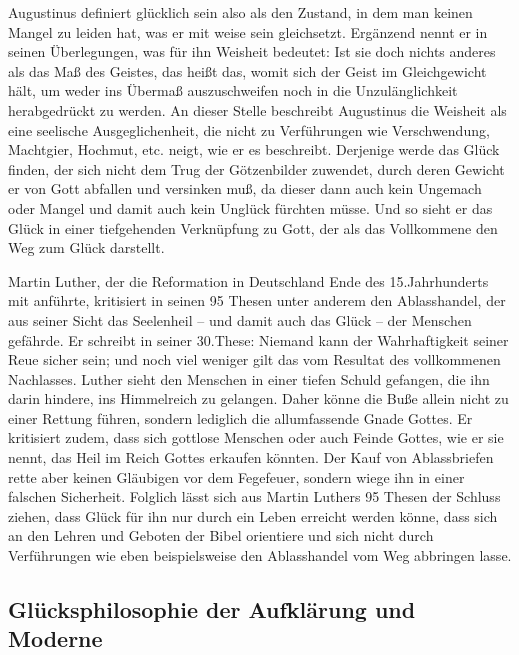 Augustinus definiert \glqq glücklich sein\grqq{} also als den Zustand, in dem man keinen Mangel zu leiden hat, was er mit \glqq weise sein\grqq{} gleichsetzt. 
Ergänzend nennt er in seinen Überlegungen, was für ihn Weisheit bedeutet: \glqq Ist sie doch nichts anderes als das Maß des Geistes, das heißt das, womit sich der Geist im Gleichgewicht hält, um weder ins Übermaß auszuschweifen noch in die Unzulänglichkeit herabgedrückt zu werden.\grqq{} \cite[S.\,59]{A82} 
An dieser Stelle beschreibt Augustinus die Weisheit als eine seelische Ausgeglichenheit, die nicht zu Verführungen wie Verschwendung, Machtgier, Hochmut, etc. neigt, wie er es beschreibt. 
Derjenige werde das Glück finden, der sich nicht \glqq dem Trug der Götzenbilder zuwendet, durch deren Gewicht er von Gott abfallen und versinken muß\grqq{}, da dieser dann auch kein Ungemach oder Mangel und damit auch kein Unglück fürchten müsse. 
Und so sieht er das Glück in einer tiefgehenden Verknüpfung zu Gott, der als das Vollkommene den Weg zum Glück darstellt.

Martin Luther, der die Reformation in Deutschland Ende des 15.Jahrhunderts mit anführte, kritisiert in seinen 95 Thesen unter anderem den Ablasshandel, der aus seiner Sicht das Seelenheil -- und damit auch das Glück -- der Menschen gefährde. 
Er schreibt in seiner 30.These: \glqq Niemand kann der Wahrhaftigkeit seiner Reue sicher sein; und noch viel weniger gilt das vom Resultat des vollkommenen Nachlasses.\grqq{} \cite[S.\,56]{ML65}
Luther sieht den Menschen in einer tiefen Schuld gefangen, die ihn darin hindere, ins Himmelreich zu gelangen. 
Daher könne die Buße allein nicht zu einer Rettung führen, sondern lediglich die allumfassende Gnade Gottes. 
Er kritisiert zudem, dass sich gottlose Menschen oder auch Feinde Gottes, wie er sie nennt, das Heil im Reich Gottes erkaufen könnten. 
Der Kauf von Ablassbriefen rette aber keinen Gläubigen vor dem Fegefeuer, sondern wiege ihn in einer falschen Sicherheit\cite[S.\,58]{ML65}.
Folglich lässt sich aus Martin Luthers 95 Thesen der Schluss ziehen, dass Glück für ihn nur durch ein Leben erreicht werden könne, dass sich an den Lehren und Geboten der Bibel orientiere und sich nicht durch Verführungen wie eben beispielsweise den Ablasshandel vom Weg abbringen lasse.


\newpage

\subsection{Glücksphilosophie der Aufklärung und Moderne}

